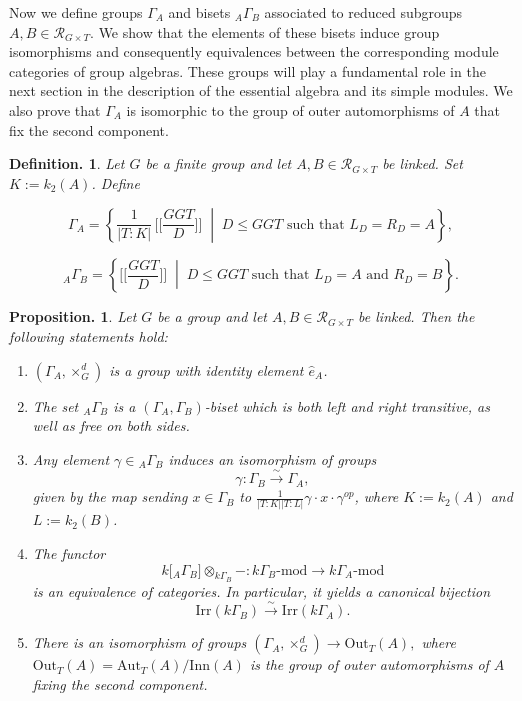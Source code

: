 \documentclass[12pt]{article}
\theoremstyle{change}
\newtheorem{prop}[theorem]{Proposition.}
\newtheorem{defi}[theorem]{Definition.}
\newcommand{\Aut}{\mathrm{Aut}}
\newcommand{\calR}{\mathcal{R}}
\newcommand{\Inn}{\mathrm{Inn}}
\newcommand{\Out}{\mathrm{Out}}
\newcommand{\1}{{\bf 1}}
\begin{document}
Now we define groups \(\Gamma_A\) and bisets \({}_A\Gamma_B\) associated to reduced subgroups \(A,B\in \mathcal{R}_{G\times T}\). We show that the elements of these bisets induce group isomorphisms and consequently equivalences between the corresponding module categories of group algebras. These groups will play a fundamental role in the next section in the description of the essential algebra and its simple modules. We also prove that \(\Gamma_A\) is isomorphic to the group of outer automorphisms of \(A\) that fix the second component.
\begin{defi}
Let $G$ be a finite group and let $A,B\in \calR_{G\times T}$ be linked. Set $K:=k_2(A)$. Define 

\smallskip

\[
\Gamma_A = \left\{ \frac{1}{|T:K|}\,\Big[\Big[\frac{GGT}{D}\Big]\Big] \;\middle|\; D \leq GGT \text{ such that } L_D = R_D = A \right\},
\]

\[
{}_A\Gamma_B = \left\{\Big[\Big[\frac{GGT}{D}\Big]\Big] \;\middle|\; D \leq GGT \text{ such that } L_D = A \text{ and } R_D = B \right\}.
\]
\end{defi}
\begin{prop}
Let $G$ be a group and let $A,B\in \calR_{G\times T}$ be linked. Then the following statements hold:
\begin{enumerate}
    \item $(\Gamma_A,\times_G^d)$ is a group with identity element $\widehat{e}_A$.
      \item The set $_A\Gamma_B$ is a $(\Gamma_A, \Gamma_B)$-biset which is both left and right transitive, as well as free on both sides.
      \item Any element $\gamma \in {}_A\Gamma_B$ induces an isomorphism of groups
    \[
    \gamma : \Gamma_B \xrightarrow{\sim} \Gamma_A,
    \]
    given by the map sending $x\in \Gamma_B$ to $\frac{1}{|T:K||T:L|}\gamma\cdot x\cdot\gamma^{op}$, where $K:=k_2(A)$ and $L:=k_2(B)$.
        \item The functor
    \[
    k\big[ {}_A\Gamma_B\big] \otimes_{k\Gamma_B} - 
    : k\Gamma_B\text{-mod} \longrightarrow k\Gamma_A\text{-mod}
    \]
    is an equivalence of categories. In particular, it yields a canonical bijection
    \[
    \mathrm{Irr}(k\Gamma_B) \xrightarrow{\sim} \mathrm{Irr}(k\Gamma_A).
    \]
       \item There is an isomorphism of groups
\(
(\Gamma_A,\times_{G}^{d}) \longrightarrow \Out_T(A),
\)
where $\Out_T(A) = \Aut_T(A)/ \Inn(A)$ is the group of outer automorphisms of \(A\) fixing the second component.
\end{enumerate}
\end{prop}
\end{document}
